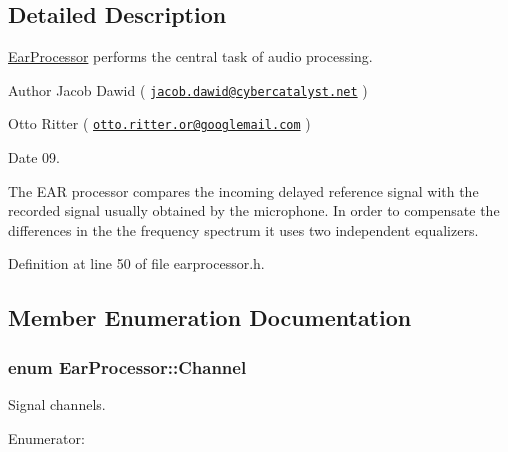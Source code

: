 \subsection{\-Detailed \-Description}
\hyperlink{classEarProcessor}{\-Ear\-Processor} performs the central task of audio processing. 

\begin{DoxyAuthor}{\-Author}
\-Jacob \-Dawid ( \href{mailto:jacob.dawid@cybercatalyst.net}{\tt jacob.\-dawid@cybercatalyst.\-net} ) 

\-Otto \-Ritter ( \href{mailto:otto.ritter.or@googlemail.com}{\tt otto.\-ritter.\-or@googlemail.\-com} ) 
\end{DoxyAuthor}
\begin{DoxyDate}{\-Date}
09.
\end{DoxyDate}
\-The \-E\-A\-R processor compares the incoming delayed reference signal with the recorded signal usually obtained by the microphone. \-In order to compensate the differences in the the frequency spectrum it uses two independent equalizers. 

\-Definition at line 50 of file earprocessor.\-h.



\subsection{\-Member \-Enumeration \-Documentation}
\hypertarget{classEarProcessor_a3162fccb5c2a95e000acbfa19abaa540}{
\subsubsection[{\-Channel}]{\setlength{\rightskip}{0pt plus 5cm}enum {\bf \-Ear\-Processor\-::\-Channel}}}\label{d2/dd5/classEarProcessor_a3162fccb5c2a95e000acbfa19abaa540}
\-Signal channels. \begin{Desc}
\item[\-Enumerator\-: ]\par
\begin{description}
\item[{\em 
\hypertarget{classEarProcessor_a3162fccb5c2a95e000acbfa19abaa540a924dc5ae5a38ef89c7bfff338bd0ec15}{\-Left\-Channel}\label{d2/dd5/classEarProcessor_a3162fccb5c2a95e000acbfa19abaa540a924dc5ae5a38ef89c7bfff338bd0ec15}
}]\item[{\em 
\hypertarget{classEarProcessor_a3162fccb5c2a95e000acbfa19abaa540a2a1d3b7e6b44b65dc8a59dfcdf7607b3}{\-Right\-Channel}\label{d2/dd5/classEarProcessor_a3162fccb5c2a95e000acbfa19abaa540a2a1d3b7e6b44b65dc8a59dfcdf7607b3}
}]\end{description}
\end{Desc}



